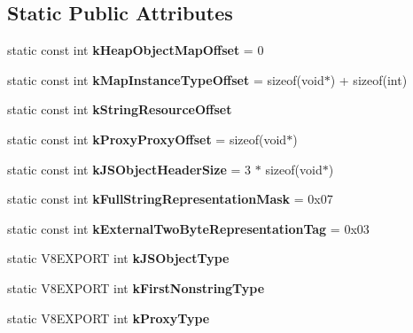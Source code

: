 \subsection*{Static Public Attributes}
\begin{DoxyCompactItemize}
\item 
\hypertarget{classv8_1_1internal_1_1_internals_a0902a596b5656b4592157eaacc020512}{}static const int {\bfseries k\+Heap\+Object\+Map\+Offset} = 0\label{classv8_1_1internal_1_1_internals_a0902a596b5656b4592157eaacc020512}

\item 
\hypertarget{classv8_1_1internal_1_1_internals_a39ea290dfaa9de300bd79aa73a874a88}{}static const int {\bfseries k\+Map\+Instance\+Type\+Offset} = sizeof(void$\ast$) + sizeof(int)\label{classv8_1_1internal_1_1_internals_a39ea290dfaa9de300bd79aa73a874a88}

\item 
static const int {\bfseries k\+String\+Resource\+Offset}
\item 
\hypertarget{classv8_1_1internal_1_1_internals_a2f7609ff68b17c9fc15d58bd2dee47aa}{}static const int {\bfseries k\+Proxy\+Proxy\+Offset} = sizeof(void$\ast$)\label{classv8_1_1internal_1_1_internals_a2f7609ff68b17c9fc15d58bd2dee47aa}

\item 
\hypertarget{classv8_1_1internal_1_1_internals_af8faf3ff3271d26bafa6ca0ea87e2a57}{}static const int {\bfseries k\+J\+S\+Object\+Header\+Size} = 3 $\ast$ sizeof(void$\ast$)\label{classv8_1_1internal_1_1_internals_af8faf3ff3271d26bafa6ca0ea87e2a57}

\item 
\hypertarget{classv8_1_1internal_1_1_internals_a5c39a86b30463928ea719def66916507}{}static const int {\bfseries k\+Full\+String\+Representation\+Mask} = 0x07\label{classv8_1_1internal_1_1_internals_a5c39a86b30463928ea719def66916507}

\item 
\hypertarget{classv8_1_1internal_1_1_internals_a73faf917416d2519b65c7255e77a74ce}{}static const int {\bfseries k\+External\+Two\+Byte\+Representation\+Tag} = 0x03\label{classv8_1_1internal_1_1_internals_a73faf917416d2519b65c7255e77a74ce}

\item 
\hypertarget{classv8_1_1internal_1_1_internals_ab82a7885d90f825ba1e20defdcb749be}{}static V8\+E\+X\+P\+O\+R\+T int {\bfseries k\+J\+S\+Object\+Type}\label{classv8_1_1internal_1_1_internals_ab82a7885d90f825ba1e20defdcb749be}

\item 
\hypertarget{classv8_1_1internal_1_1_internals_a613844c85afb4e5f1c8a42bbb519d3a1}{}static V8\+E\+X\+P\+O\+R\+T int {\bfseries k\+First\+Nonstring\+Type}\label{classv8_1_1internal_1_1_internals_a613844c85afb4e5f1c8a42bbb519d3a1}

\item 
\hypertarget{classv8_1_1internal_1_1_internals_af263ee9229311eefdc05ad96160e4161}{}static V8\+E\+X\+P\+O\+R\+T int {\bfseries k\+Proxy\+Type}\label{classv8_1_1internal_1_1_internals_af263ee9229311eefdc05ad96160e4161}

\end{DoxyCompactItemize}



